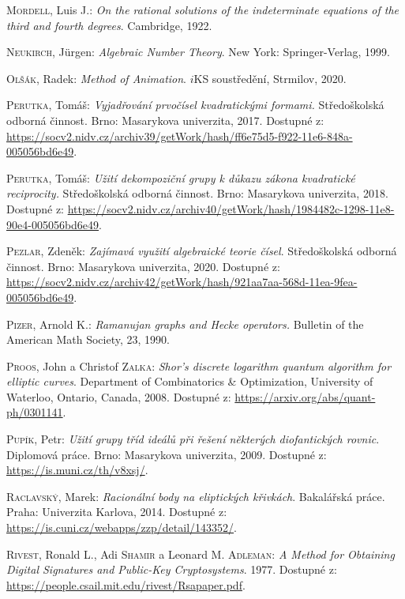 \documentclass[12pt]{report}
\begin{document}
\begin{thebibliography}{97}
\textsc{Mordell}, Luis J.: \textit{On the rational solutions of the indeterminate equations of the third and fourth degrees}. Cambridge, 1922.

\textsc{Neukirch}, J{\"u}rgen: \textit{Algebraic Number Theory}. New York: Springer-Verlag, 1999.

\textsc{Olšák}, Radek: \textit{Method of Animation}. $i$KS soustředění, Strmilov, 2020.

\textsc{Perutka}, Tomáš: \textit{Vyjadřování prvočísel kvadratickými formami.} Středoškolská odborná činnost. Brno: Masarykova univerzita, 2017. Dostupné z: \url{https://socv2.nidv.cz/archiv39/getWork/hash/ff6e75d5-f922-11e6-848a-005056bd6e49}.

\textsc{Perutka}, Tomáš: \textit{Užití dekompoziční grupy k důkazu zákona kvadratické reciprocity.} Středoškolská odborná činnost. Brno: Masarykova univerzita, 2018. Dostupné z: \url{https://socv2.nidv.cz/archiv40/getWork/hash/1984482c-1298-11e8-90e4-005056bd6e49}.


\textsc{Pezlar}, Zdeněk: \textit{Zajímavá využití algebraické teorie čísel}. Středoškolská odborná činnost. Brno: Masarykova univerzita, 2020. Dostupné z: \url{https://socv2.nidv.cz/archiv42/getWork/hash/921aa7aa-568d-11ea-9fea-005056bd6e49}.

\textsc{Pizer}, Arnold K.: \textit{Ramanujan graphs and Hecke operators.} Bulletin of the American Math Society, 23, 1990.

\textsc{Proos}, John a Christof \textsc{Zalka}: \textit{Shor’s discrete logarithm quantum algorithm for elliptic curves}. Department of Combinatorics \& Optimization, University of Waterloo,  Ontario, Canada, 2008. Dostupné z: \url{https://arxiv.org/abs/quant-ph/0301141}.

\textsc{Pupík}, Petr: \textit{Užití grupy tříd ideálů při řešení některých diofantických rovnic}. Diplomová práce. Brno: Masarykova univerzita, 2009. Dostupné z: \url{https://is.muni.cz/th/v8xsj/}.

\textsc{Raclavský}, Marek: \textit{Racionální body na eliptických křivkách}. Bakalářská práce. Praha: Univerzita Karlova, 2014. Dostupné z: \url{https://is.cuni.cz/webapps/zzp/detail/143352/}.

\textsc{Rivest}, Ronald L., Adi \textsc{Shamir} a Leonard M. \textsc{Adleman}: \textit{A Method for Obtaining Digital Signatures and Public-Key Cryptosystems}. 1977. Dostupné z: \url{https://people.csail.mit.edu/rivest/Rsapaper.pdf}. 


\end{thebibliography}
\end{document}
